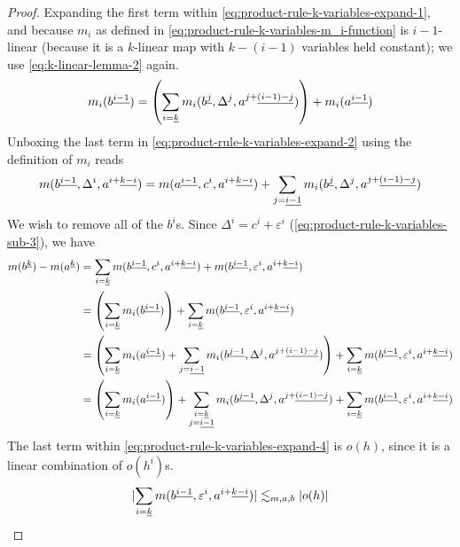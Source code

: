 \documentclass[../main-v2-manifolds.tex]{subfiles}
\begin{document}
\begin{proof}
    Expanding the first term within \cref{eq:product-rule-k-variables-expand-1}, and because $m_i$ as defined in \cref{eq:product-rule-k-variables-m_i-function} is $i-1$-linear (because it is a $k$-linear map with $k-(i-1)$ variables held constant); we use \cref{eq:k-linear-lemma-2} again.
    \begin{equation}\label{eq:product-rule-k-variables-expand-2}
        m_i(\UPL{b}[i-1]) = \qty(\sum_{i=\underline{k}} m_i(\UPL{b}[j], \Delta^j, \UPL{a}[j+][(i-1)-j])) + m_i(\UPL{a}[i-1])
    \end{equation}
    Unboxing the last term in \cref{eq:product-rule-k-variables-expand-2} using the definition of $m_i$ reads
    \begin{equation}\label{eq:product-rule-k-variables-expand-3}
        m(\UPL{b}[i-1],\Delta^i,\UPL{a}[i+][k-i]) = m(\UPL{a}[i-1],c^i,\UPL{a}[i+][k-i]) + \sum_{j=\underline{i-1}}m_i(\UPL{b}[j],\Delta^j,\UPL{a}[j+][(i-1)-j])
    \end{equation}
    We wish to remove all of the $b^i$s. Since $\Delta^i = c^i + \varepsilon^i$ (\cref{eq:product-rule-k-variables-sub-3}), we have
    \begin{align}
        m(\UPL{b}[k]) - m(\UPL{a}[k]) &= \sum_{i=\underline{k}} m(\UPL{b}[i-1],c^i,\UPL{a}[i+][k-i]) + m(\UPL{b}[i-1],\varepsilon^i,\UPL{a}[i+][k-i])\nonumber\\
        &= \qty(\sum_{i=\underline{k}}m_i(\UPL{b}[i-1])) + \sum_{i=\underline{k}}m(\UPL{b}[i-1],\varepsilon^i,\UPL{a}[i+][k-i])\nonumber\\
        &= \qty(\sum_{i=\underline{k}} m_i(\UPL{a}[i-1]) + \sum_{j=\underline{i-1}}m_i(\UPL{b}[j-1],\Delta^{j},\UPL{a}[j+][(i-1)-j])) + \sum_{i=\underline{k}} m(\UPL{b}[i-1],\varepsilon^i,\UPL{a}[i+][k-i])\nonumber\\
        &= \qty(\sum_{i=\underline{k}}m_i(\UPL{a}[i-1]))  + \sum_{\substack{i=\underline{k}\\ j=\underline{i-1}}} m_i(\UPL{b}[j-1],\Delta^j,\UPL{a}[j+][(i-1)-j]) + \sum_{i=\underline{k}}m(\UPL{b}[i-1], \varepsilon^i,\UPL{a}[i+][k-i])\label{eq:product-rule-k-variables-expand-4}
    \end{align}
    The last term within \cref{eq:product-rule-k-variables-expand-4} is $o(h)$, since it is a linear combination of $o(h^i)$s. 
    \begin{equation}\label{eq:product-rule-k-variables-last-term-o(h)}
    \abs{\sum_{i=\underline{k}}m(\UPL{b}[i-1], \varepsilon^i,\UPL{a}[i+][k-i])}\Lsim_{m,a,b}\vert o(h)\vert
    \end{equation}

\end{proof}
\end{document}

